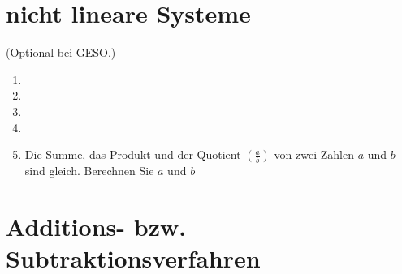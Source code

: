 \newpage
\section{nicht lineare Systeme}
(Optional bei GESO.)

\begin{enumerate}[label=\alph*)]
\item 
{}



\item 
{}



\item 
{}



\item 
{}


\item
Die Summe, das Produkt und der Quotient $\left(\frac{a}{b}\right)$ von
zwei Zahlen $a$ und $b$ sind gleich. Berechnen Sie $a$ und $b$


\end{enumerate}

\newpage
\section{Additions- bzw. Subtraktionsverfahren}

